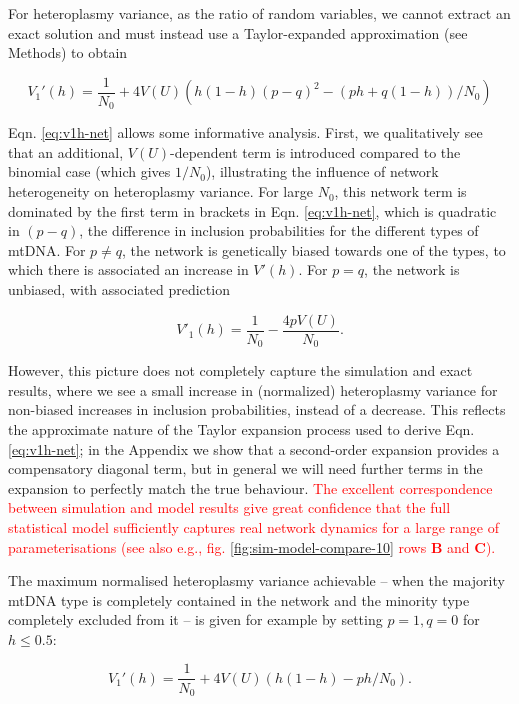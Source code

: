 \documentclass{article}
\newcommand{\be}{\begin{equation}}
\newcommand{\ee}{\end{equation}}
\begin{document}
For heteroplasmy variance, as the ratio of random variables, we cannot extract an exact solution and must instead use a Taylor-expanded approximation (see Methods) to obtain 

\be\label{eq:v1h-net}
    V_1'(h)=\frac{1}{N_0} + 4 V(U) \left( h(1-h) (p-q)^2 - (p h + q(1-h))/N_0 \right)
    \ee

Eqn. \ref{eq:v1h-net} allows some informative analysis. First, we qualitatively see that an additional, $V(U)$-dependent term is introduced compared to the binomial case (which gives $1/N_0$), illustrating the influence of network heterogeneity on heteroplasmy variance. For large $N_0$, this network term is dominated by the first term in brackets in Eqn. \ref{eq:v1h-net}, which is quadratic in $(p-q)$, the difference in inclusion probabilities for the different types of mtDNA. For $p\neq q$, the network is genetically biased towards one of the types, to which there is associated an increase in $V'(h)$. For $p=q$, the network is unbiased, with associated prediction

\begin{equation}
V'_1(h) = \frac{1}{N_0} - \frac{4 p V(U)}{N_0}.
\end{equation}

However, this picture does not completely capture the simulation and exact results, where we see a small increase in (normalized) heteroplasmy variance for non-biased increases in inclusion probabilities, instead of a decrease. This reflects the approximate nature of the Taylor expansion process used to derive Eqn. \ref{eq:v1h-net}; in the Appendix we show that a second-order expansion provides a compensatory diagonal term, but in general we will need further terms in the expansion to perfectly match the true behaviour. \textcolor{red}{The excellent correspondence between simulation and model results give great confidence that the full statistical model sufficiently captures real network dynamics for a large range of parameterisations (see also e.g., fig. \ref{fig:sim-model-compare-10} rows \textbf{B} and \textbf{C}).}

The maximum normalised heteroplasmy variance achievable -- when the majority mtDNA type is completely contained in the network and the minority type completely excluded from it -- is given for example by setting $p = 1, q= 0$ for $h \leq 0.5$:

\begin{equation}\label{eq:symm-max-vh}
   V_1'(h)=\frac{1}{N_0} + 4 V(U) \left( h(1-h) - p h/N_0 \right).
\end{equation}
\end{document}
